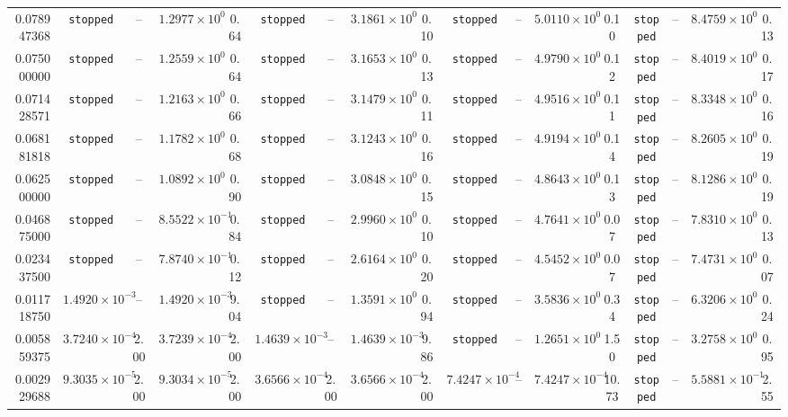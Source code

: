 \begin{table}
{\begin{tabular}{r cc cc cc cc cc cc cc cc }
0.078947368 & \texttt{stopped} & -- & $1.2977\times10^{0}$ & 0.64 & \texttt{stopped} & -- & $3.1861\times10^{0}$ & 0.10 & \texttt{stopped} & -- & $5.0110\times10^{0}$ & 0.10 & \texttt{stopped} & -- & $8.4759\times10^{0}$ & 0.13 \\
0.075000000 & \texttt{stopped} & -- & $1.2559\times10^{0}$ & 0.64 & \texttt{stopped} & -- & $3.1653\times10^{0}$ & 0.13 & \texttt{stopped} & -- & $4.9790\times10^{0}$ & 0.12 & \texttt{stopped} & -- & $8.4019\times10^{0}$ & 0.17 \\
0.071428571 & \texttt{stopped} & -- & $1.2163\times10^{0}$ & 0.66 & \texttt{stopped} & -- & $3.1479\times10^{0}$ & 0.11 & \texttt{stopped} & -- & $4.9516\times10^{0}$ & 0.11 & \texttt{stopped} & -- & $8.3348\times10^{0}$ & 0.16 \\
0.068181818 & \texttt{stopped} & -- & $1.1782\times10^{0}$ & 0.68 & \texttt{stopped} & -- & $3.1243\times10^{0}$ & 0.16 & \texttt{stopped} & -- & $4.9194\times10^{0}$ & 0.14 & \texttt{stopped} & -- & $8.2605\times10^{0}$ & 0.19 \\
0.062500000 & \texttt{stopped} & -- & $1.0892\times10^{0}$ & 0.90 & \texttt{stopped} & -- & $3.0848\times10^{0}$ & 0.15 & \texttt{stopped} & -- & $4.8643\times10^{0}$ & 0.13 & \texttt{stopped} & -- & $8.1286\times10^{0}$ & 0.19 \\
0.046875000 & \texttt{stopped} & -- & $8.5522\times10^{-1}$ & 0.84 & \texttt{stopped} & -- & $2.9960\times10^{0}$ & 0.10 & \texttt{stopped} & -- & $4.7641\times10^{0}$ & 0.07 & \texttt{stopped} & -- & $7.8310\times10^{0}$ & 0.13 \\
0.023437500 & \texttt{stopped} & -- & $7.8740\times10^{-1}$ & 0.12 & \texttt{stopped} & -- & $2.6164\times10^{0}$ & 0.20 & \texttt{stopped} & -- & $4.5452\times10^{0}$ & 0.07 & \texttt{stopped} & -- & $7.4731\times10^{0}$ & 0.07 \\
0.011718750 & $1.4920\times10^{-3}$ & -- & $1.4920\times10^{-3}$ & 9.04 & \texttt{stopped} & -- & $1.3591\times10^{0}$ & 0.94 & \texttt{stopped} & -- & $3.5836\times10^{0}$ & 0.34 & \texttt{stopped} & -- & $6.3206\times10^{0}$ & 0.24 \\
0.005859375 & $3.7240\times10^{-4}$ & 2.00 & $3.7239\times10^{-4}$ & 2.00 & $1.4639\times10^{-3}$ & -- & $1.4639\times10^{-3}$ & 9.86 & \texttt{stopped} & -- & $1.2651\times10^{0}$ & 1.50 & \texttt{stopped} & -- & $3.2758\times10^{0}$ & 0.95 \\
0.002929688 & $9.3035\times10^{-5}$ & 2.00 & $9.3034\times10^{-5}$ & 2.00 & $3.6566\times10^{-4}$ & 2.00 & $3.6566\times10^{-4}$ & 2.00 & $7.4247\times10^{-4}$ & -- & $7.4247\times10^{-4}$ & 10.73 & \texttt{stopped} & -- & $5.5881\times10^{-1}$ & 2.55 \\
\bottomrule
\end{tabular}}
\end{table}
